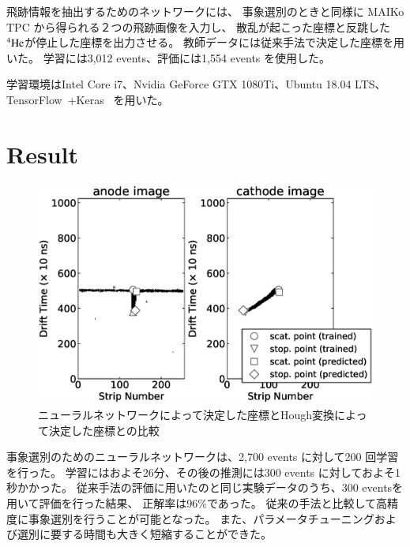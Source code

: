 \documentclass{jps-cp}
\begin{document}
飛跡情報を抽出するためのネットワークには、
事象選別のときと同様に MAIKo TPC から得られる２つの飛跡画像を入力し、
散乱が起こった座標と反跳した${}^{4}\rm{He}$が停止した座標を出力させる。
教師データには従来手法で決定した座標を用いた。
学習には3,012 events、評価には1,554 events を使用した。

学習環境はIntel Core i7、Nvidia GeForce GTX 1080Ti、Ubuntu 18.04 LTS、
TensorFlow~\cite{tensorflow}+Keras~\cite{keras} を用いた。

\section{Result}
\begin{figure}
  \vspace{-6zw}
  \centering
  \includegraphics[clip, width=25zw]{eps/compare_mono.eps}
  \caption{ニューラルネットワークによって決定した座標とHough変換によって決定した座標との比較}
  \label{fig:result_detection}
  \vspace{-2zw}
\end{figure}

事象選別のためのニューラルネットワークは、2,700 events に対して200 回学習を行った。
学習にはおよそ26分、その後の推測には300 events に対しておよそ1秒かかった。
従来手法の評価に用いたのと同じ実験データのうち、300 eventsを用いて評価を行った結果、
正解率は96\%であった。
従来の手法と比較して高精度に事象選別を行うことが可能となった。
また、パラメータチューニングおよび選別に要する時間も大きく短縮することができた。
\end{document}
